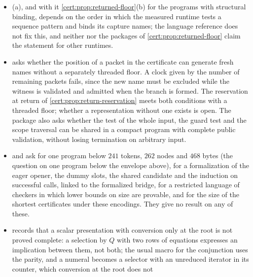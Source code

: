 \begin{itemize}
are written proofs for ideal executions; no package claims a formalization in a
proof assistant, a minimal program or a program below all coordinates of an
envelope. The agreement of the readable forms with their programs is not proved.
The censuses ($4815$ occurrences and $1189$ distinct candidate sources in
, $5232$ occurrences and $1881$ distinct sources in
) are censuses of finite corpora, not lower bounds.
\item {}(a), and with it \cref{cert:prop:returned-floor}(b)
for the programs with structural binding, depends on the order in which the
measured runtime tests a sequence pattern and binds its capture names; the
language reference does not fix this, and neither  nor the
packages of \cref{cert:prop:returned-floor} claim the statement for other
runtimes.
\item {} asks whether the position of a packet in the
certificate can generate fresh names without a separately threaded floor. A
clock given by the number of remaining packets fails, since the new name must be
excluded while the witness is validated and admitted when the branch is
formed. The reservation at return of \cref{cert:prop:return-reservation} meets
both conditions with a threaded floor; whether a representation without one
exists is open. The package also asks whether the test of the whole input, the
guard test and the scope traversal can be shared in a compact program with
complete public validation, without losing termination on arbitrary input.
\item {} and  ask for one program
below $241$ tokens, $262$ nodes and $468$ bytes (the question on one program below
the envelope above), for a formalization of the eager opener, the dummy slots, the shared candidate and the induction on
successful calls, linked to the formalized bridge, for a restricted language of
checkers in which lower bounds on size are provable, and for the size of the
shortest certificates under these encodings. They give no result on any of
these.
\item {} records that a scalar presentation with
conversion only at the root is not proved complete: a selection by $Q$ with two
rows of equations expresses an implication between them, not both; the usual
macro for the conjunction uses the parity, and a numeral becomes a selector with
an unreduced iterator in its counter, which conversion at the root does not

\end{itemize}
